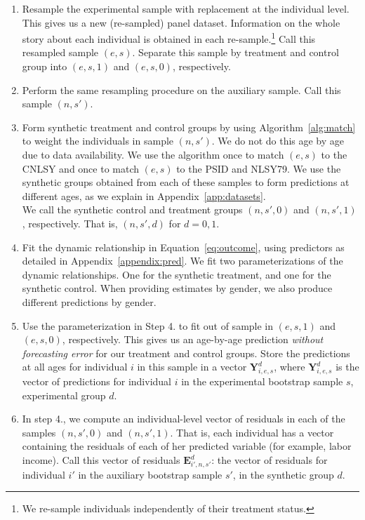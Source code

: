 \begin{enumerate}
\item Resample the experimental sample with replacement at the individual level. This gives us a new (re-sampled) panel dataset. Information on the whole story about each individual is obtained in each re-sample.\footnote{We re-sample individuals independently of their treatment status.} Call this resampled sample $(e,s)$. Separate this sample by treatment and control group into $(e,s,1)$ and $(e,s,0)$, respectively.

\item Perform the same resampling procedure on the auxiliary sample. Call this sample $(n,s')$.

\item Form synthetic treatment and control groups by using Algorithm~\ref{alg:match} to weight the individuals in sample $(n,s')$. We do not do this age by age due to data availability. We use the algorithm once to match $(e,s)$ to the CNLSY and once to match $(e,s)$ to the PSID and NLSY79. We use the synthetic groups obtained from each of these samples to form predictions at different ages, as we explain in Appendix~\ref{app:datasets}.\\

\noindent We call the synthetic control and treatment groups $(n,s',0)$ and $(n,s',1)$, respectively. That is, $(n,s',d)$ for $d = {0,1}$. 

\item Fit the dynamic relationship in Equation~\eqref{eq:outcome}, using predictors as detailed in Appendix~\ref{appendix:pred}. We fit two parameterizations of the dynamic relationships. One for the synthetic treatment, and one for the synthetic control. When providing estimates by gender, we also produce different predictions by gender.

\item Use the parameterization in Step 4. to fit out of sample in $(e,s,1)$ and $(e,s,0)$, respectively. This gives us an age-by-age prediction \textit{without forecasting error} for our treatment and control groups. Store the predictions at all ages for individual $i$ in this sample in a vector $\bm{Y}_{i,e,s}^d$, where $\bm{Y}_{i,e,s}^d$ is the vector of predictions for individual $i$ in the experimental bootstrap sample $s$, experimental group $d$.

\item In step 4., we compute an individual-level vector of residuals in each of the samples $(n,s',0)$ and $(n,s',1)$. That is, each individual has a vector containing the residuals of each of her predicted variable (for example, labor income). Call this vector of residuals $\bm{E}_{i',n,s'}^d$: the vector of residuals for individual $i'$ in the auxiliary bootstrap sample $s'$, in the synthetic group $d$. 


\end{enumerate}
